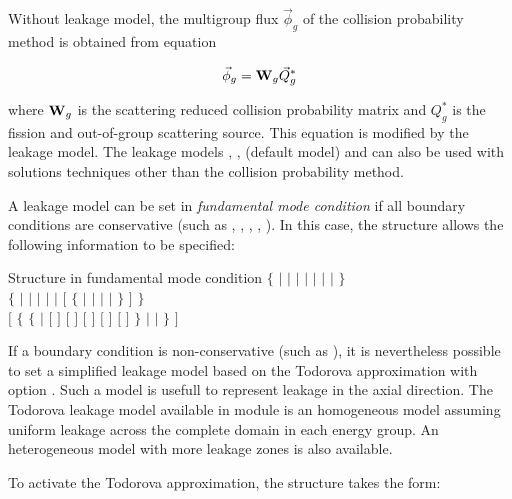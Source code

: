 Without leakage model, the multigroup flux $\vec\phi_g$ of the collision
probability method is obtained from equation

\begin{equation}
\vec\phi_g={\bf W}_g \vec Q^{*}_g
\label{eq:eq3.64}
\end{equation}

\noindent where ${\bf W}_g$ is the scattering reduced collision probability matrix
and $ Q^{*}_g$ is the fission and out-of-group scattering source. This equation is
modified by the leakage model. The leakage models , , 
(default model) and  can also be used with solutions techniques other than
the collision probability method.

\vskip 0.2cm

A leakage model can be set in {\sl fundamental mode condition} if all boundary conditions are
conservative (such as , , , , ). In this
case, the  structure allows the following information to be specified:

\begin{DataStructure}{Structure  in fundamental mode condition}
$\{$  $|$  $|$  $|$  $|$  $|$  $|$  $|$  $\}$ \\
$\{$  $|$  $|$  $|$  $|$  $|$ 
$[$ $\{$  $|$  $|$  $|$  $|$  $\}$ $]$ $\}$ \\
$[$ $\{$  $\{$  $|$ $[$   $]$  
$[$   $]$ $[$   $]$ 
$[$   $]$
$[$   $]$ $\}$
$|$   $|$  $\}$
$]$  \end{DataStructure}

If a boundary condition is non-conservative (such as ), it is nevertheless possible to set a
simplified leakage model based on the Todorova approximation with option . Such a model is
usefull to represent leakage in the axial direction. The Todorova leakage model available in module
 is an homogeneous model assuming uniform leakage across the complete domain in each
energy group. An heterogeneous model with more leakage zones is also available.

\vskip 0.08cm

To activate the Todorova approximation, the  structure takes the form:

